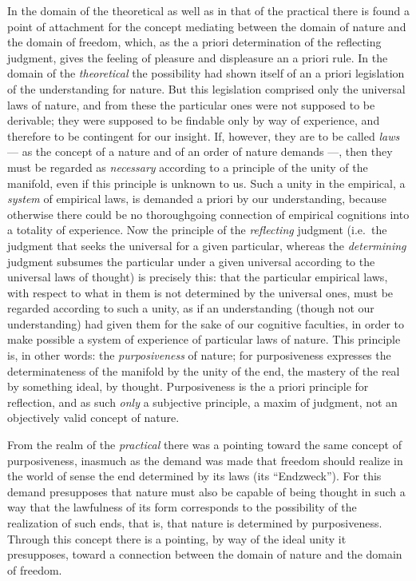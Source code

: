 In the domain of the theoretical as well as in that of the practical
there is found a point of attachment for the concept mediating between
the domain of nature and the domain of freedom,
which, as the a priori determination of the reflecting judgment, gives
the feeling of pleasure and displeasure an a priori rule. In the domain
of the \emph{theoretical} the possibility had shown itself of an a
priori legislation of the understanding for nature. But this
legislation comprised only the universal laws of nature, and from these
the particular ones were not supposed to be derivable; they were
supposed to be findable only by way of experience, and therefore to be
contingent for our insight. If, however, they are to be called
\emph{laws} --- as the concept of a nature and of an order of nature
demands ---, then they must be regarded as \emph{necessary} according to
a principle of the unity of the manifold, even if this principle is
unknown to us. Such a unity in the empirical, a \emph{system} of
empirical laws, is demanded a priori by our understanding, because
otherwise there could be no thoroughgoing connection of empirical
cognitions into a totality of experience. Now the principle of the
\emph{reflecting} judgment (i.e.\ the judgment that seeks the universal
for a given particular, whereas the \emph{determining} judgment
subsumes the particular under a given universal according to the
universal laws of thought) is precisely this: that the particular
empirical laws, with respect to what in them is not determined by the
universal ones, must be regarded according to such a unity,
as if an understanding (though not our understanding) had given them
for the sake of our cognitive faculties, in order to make possible a
system of experience of particular laws of nature. This principle is,
in other words: the \emph{purposiveness} of nature; for purposiveness
expresses the determinateness of the manifold by the unity of the end,
the mastery of the real by something ideal, by thought. Purposiveness
is the a priori principle for reflection, and as such \emph{only} a
subjective principle, a maxim of judgment, not an objectively valid
concept of nature.

From the realm of the \emph{practical} there was a pointing toward the
same concept of purposiveness, inasmuch as the demand was made that
freedom should realize in the world of sense the end determined by its
laws (its ``Endzweck''). For this demand presupposes that nature must
also be capable of being thought in such a way that the lawfulness of
its form corresponds to the possibility of the realization of such
ends, that is, that nature is determined by purposiveness. Through this
concept there is a pointing, by way of the ideal unity it presupposes,
toward a connection between the domain of nature and the domain of
freedom.

